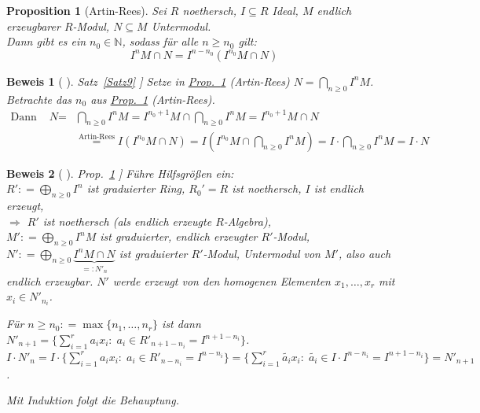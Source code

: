 \documentclass[a4paper,12pt]{scrbook}
\theoremstyle{break}
\newtheorem{Prop}[Def]{Proposition}
\theoremstyle{nonumberbreak}
\newtheorem{Bew}{Beweis}
\theoremstyle{nonumberplain}
\newcommand{\defeqr}[0]{\mathrel{\mathop:}=}
\newcommand{\defeql}[0]{=\mathrel{\mathop:}}
\newcommand{\myref}[2]{%
\hyperref[#2]{#1~\ref*{#2}}%
}
\begin{document}
\begin{Prop}[Artin-Rees]
\label{2.23}
  Sei $R$ noethersch, $I \subseteq R$ Ideal, $M$ endlich erzeugbarer $R$-Modul, $N \subseteq M$ Untermodul.\\
  Dann gibt es ein $n_0 \in \mathbb{N}$, sodass für alle $n \geq n_0$ gilt:
  \[I^n M \cap N = I ^{n-n_0} (I^{n_0}M \cap N)\]
\end{Prop}

\begin{Bew}[\myref{Satz}{Satz9}]
  Setze in \myref{Prop.}{2.23} (Artin-Rees) $N = \bigcap_{n \geq 0} I^n M$. Betrachte das $n_0$ aus \myref{Prop.}{2.23} (Artin-Rees).
  \begin{eqnarray*}
    \text{Dann ist } N & = & \bigcap_{n \geq 0} I^n M = I^{n_0 +1} M \cap \bigcap_{n \geq 0} I^n M = I^{n_0 + 1}M \cap N \\
                       & & \overset{\text{Artin-Rees}}{=} I(I^{n_0}M \cap N) = I ( I^{n_0}M \cap \bigcap_{n \geq 0} I^n M ) = I \cdot \bigcap_{n \geq 0} I^n M = I \cdot N
  \end{eqnarray*}
\end{Bew}

\begin{Bew}[\myref{Prop.}{2.23}]
  Führe Hilfsgrößen ein:\\
  $R' \defeqr \bigoplus_{n \geq 0} I^n$ ist graduierter Ring, $R_0' = R$ ist noethersch, $I$ ist endlich erzeugt,\\
  $\Rightarrow$ $R'$ ist noethersch (als endlich erzeugte $R$-Algebra),\\
  $M' \defeqr \bigoplus_{n \geq 0} I^n M$ ist graduierter, endlich erzeugter $R'$-Modul,\\
  $N' \defeqr \bigoplus_{n \geq 0} \underset{\defeql N'_n}{\underbrace{I^nM \cap N}}$ ist graduierter $R'$-Modul, Untermodul von $M'$, also auch endlich erzeugbar.
  $N'$ werde erzeugt von den homogenen Elementen $x_1, \dots, x_r$ mit $x_i \in N'_{n_i}$.

  Für $n \geq n_0 \defeqr \max \{n_1, \dots, n_r\}$ ist dann $N'_{n+1} = \{\sum_{i=1}^r a_i x_i: \; a_i \in R'_{n+1-n_i} = I^{n+1-n_i}\}$.\\
  $I \cdot N'_n = I \cdot \{\sum_{i=1}^r a_i x_i: \; a_i \in R'_{n-n_i} = I^{n-n_i}\} = \{\sum_{i=1}^r \tilde{a_i} x_i: \; \tilde{a_i} \in I \cdot I^{n-n_i} = I^{n+1-n_i}\} = N'_{n+1}$.

  Mit Induktion folgt die Behauptung.
\end{Bew}
\end{document}
